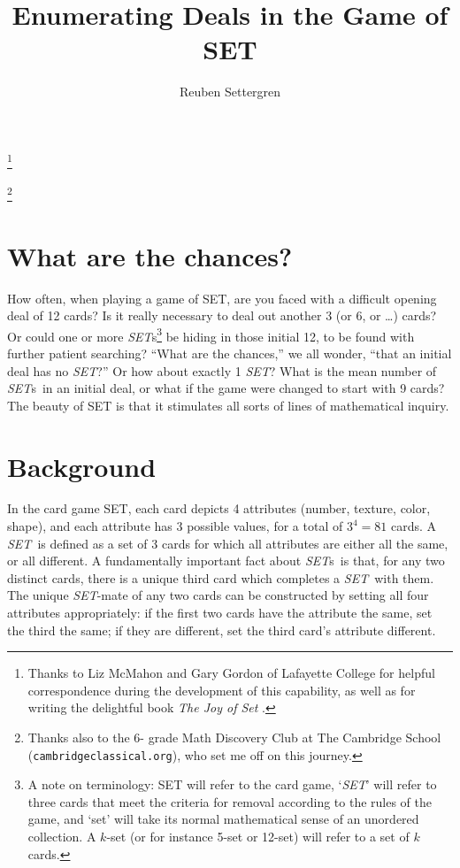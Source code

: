 \documentclass{article}
\theoremstyle{theorem}
\theoremstyle{definition}
\newcommand{\SET}{{\em SET}}
\newcommand{\SETs}{{\em SET}s}
\begin{document}
\title{Enumerating Deals in the Game of SET}
\author{Reuben Settergren}

\thanks{Thanks to Liz McMahon and Gary Gordon of Lafayette College for helpful
  correspondence during the development of this capability, as well as for
  writing the delightful book {\em The Joy of Set} \cite{JOS}.}

\thanks{Thanks also to the 6- grade Math Discovery Club at The Cambridge
  School ({\tt cambridgeclassical.org}), who set me off on this journey.}

\maketitle


\section{What are the chances?}
How often, when playing a game of SET\texttrademark, are you faced with a
difficult opening deal of 12 cards? Is it really necessary to deal out another 3
(or 6, or \ldots) cards? Or could one or more \SETs\footnote{A note on
terminology: SET will refer to the card game, `\SET' will refer to three cards
that meet the criteria for removal according to the rules of the game, and `set'
will take its normal mathematical sense of an unordered collection. A $k$-set
(or for instance 5-set or 12-set) will refer to a set of $k$ cards.} be hiding
in those initial 12, to be found with further patient searching?  ``What are the
chances,'' we all wonder, ``that an initial deal has no \SET?'' Or how about
exactly 1 \SET? What is the mean number of \SETs~in an initial deal, or what if
the game were changed to start with 9 cards? The beauty of SET is that it
stimulates all sorts of lines of mathematical inquiry.


\section{Background}
In the card game SET, each card depicts 4 attributes (number, texture, color,
shape), and each attribute has 3 possible values, for a total of $3^4=81$
cards. A \SET~is defined as a set of 3 cards for which all attributes are
either all the same, or all different. A fundamentally important fact about
\SETs~is that, for any two distinct cards, there is a unique third card which
completes a \SET~with them. The unique \SET-mate of any two cards can be
constructed by setting all four attributes appropriately: if the first two cards
have the attribute the same, set the third the same; if they are different, set
the third card's attribute different.
\end{document}
